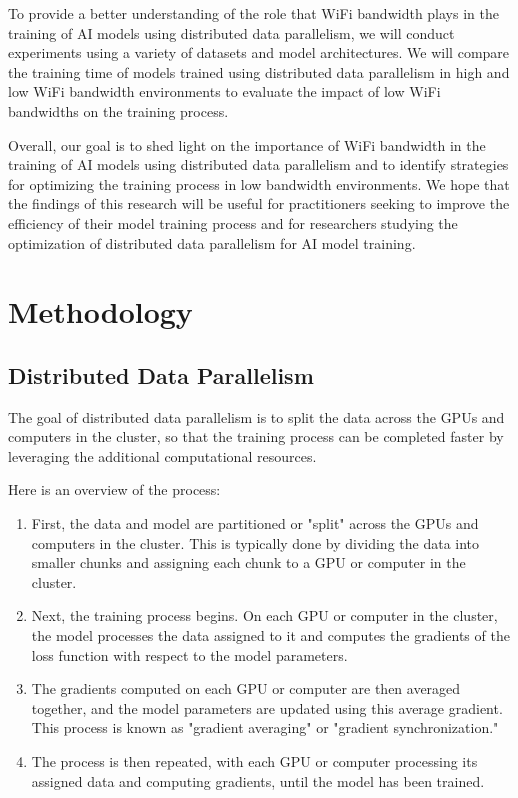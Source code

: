 \documentclass[11pt]{article}
\begin{document}
To provide a better understanding of the role that WiFi bandwidth plays in the training of AI models using distributed data parallelism, we will conduct experiments using a variety of datasets and model architectures. We will compare the training time of models trained using distributed data parallelism in high and low WiFi bandwidth environments to evaluate the impact of low WiFi bandwidths on the training process.

Overall, our goal is to shed light on the importance of WiFi bandwidth in the training of AI models using distributed data parallelism and to identify strategies for optimizing the training process in low bandwidth environments. We hope that the findings of this research will be useful for practitioners seeking to improve the efficiency of their model training process and for researchers studying the optimization of distributed data parallelism for AI model training.

\section{Methodology}
\subsection{Distributed Data Parallelism}
The goal of distributed data parallelism is to split the data across the GPUs and computers in the cluster, so that the training process can be completed faster by leveraging the additional computational resources.

Here is an overview of the process:

\begin{enumerate}
	\item First, the data and model are partitioned or "split" across the GPUs and computers in 			  the cluster. This is typically done by dividing the data into smaller chunks and 	  				   assigning each chunk to a GPU or computer in the cluster.
	\item Next, the training process begins. On each GPU or computer in the cluster, the model 				  processes the data assigned to it and computes the gradients of the loss function with 		  respect to the model parameters.
	\item The gradients computed on each GPU or computer are then averaged together, and the 				  model parameters are updated using this average gradient. This process is known as 				  "gradient averaging" or "gradient synchronization."
	\item The process is then repeated, with each GPU or computer processing its assigned data 				  and computing gradients, until the model has been trained.
\end{enumerate}
\end{document}
